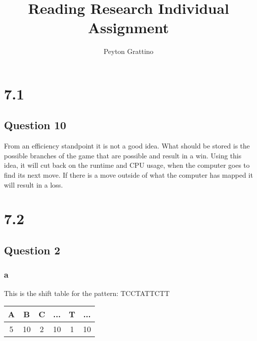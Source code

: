 \documentclass[12pt]{amsart}
\title{Reading Research Individual Assignment}
\author{Peyton Grattino}
\date{} %
\begin{document}
\maketitle
\tableofcontents
\pagebreak

\setcounter{secnumdepth}{0}
\section{7.1}
\hfill\break
\subsection{Question 10}
\hfill\break
From an efficiency standpoint it is not a good idea. What should be stored is the possible branches of the game that are possible and result in a win. Using this idea, it will cut back on the runtime and CPU usage, when the computer goes to find its next move. If there is a move outside of what the computer has mapped it will result in a loss.

\newpage
\section{7.2}
\hfill\break
\subsection{Question 2}
\hfill\break
\subsubsection{a}
This is the shift table for the pattern: TCCTATTCTT \hfill\break
\begin{center}
\begin{tabular}{| c | c | c | c | c | c |}
\hline
A & B & C & ... & T & ...\\
\hline
5 & 10 & 2 & 10 & 1 & 10 \\
\hline
\end{tabular}
\end{center}
\hfill\break
\end{document}
